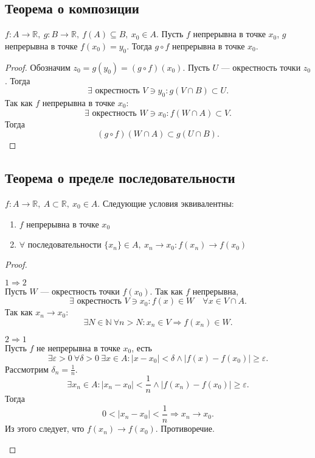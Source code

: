 \documentclass[11pt]{book}
\newcommand{\N}{\mathbb{N}}
\newcommand{\R}{\mathbb{R}}
\renewcommand{\ge}{\geqslant}
\theoremstyle{definition}
\theoremstyle{plain}
\theoremstyle{plain}
\theoremstyle{definition}
\theoremstyle{remark}
\begin{document}
\subsection{Теорема о композиции}
\begin{thm}[о композиции]
    $ f: A \to  \R, ~ g: B \to  \R, ~ f(A) \subseteq B, ~ x_0 \in A$. Пусть $ f$ непрерывна в точке $ x_0$, $ g$ непрерывна в точке  $ f(x_0) = y_0$.
    Тогда $ g\circ f$ непрерывна в точке $ x_0$.
\end{thm}
\begin{proof}
    Обозначим $ z_0 = g(y_0) = (g \circ f)(x_0)$.
    Пусть $ U$ --- окрестность точки $ z_0$. Тогда
    \[
	\exists \text{ окрестность }   V \ni y_0: g(V \cap B) \subset U
    .\]
    Так как $ f$ непрерывна в точке  $ x_0$:
    \[
	\exists  \text{ окрестность }  W \ni x_0: f(W \cap A) \subset  V
    .\]
    Тогда \[
	(g \circ f)(W \cap A) \subset g(U \cap B)
    .\]
\end{proof}
\subsection{Теорема о пределе последовательности}
\begin{thm}
    $ f: A \to \R, ~ A\subset \R, ~ x_0 \in A$.
    Следующие условия эквивалентны:
    \begin{enumerate}
	\item $ f$ непрерывна в точке  $ x_0$
	\item $ \forall \text{ последовательности }\{x_{n}\} \in A, ~ x_{n} \to  x_0: f(x_{n}) \to  f(x_0)$
    \end{enumerate}
\end{thm}
\begin{proof}
    $ $
    \begin{description}
	\item $ \boxed{1 \Longrightarrow 2}$ \\
	    Пусть  $ W$ --- окрестность точки  $ f(x_0)$.  Так как $ f$ непрерывна,
	    \[
		\exists \text{ окрестность } V \ni  x_0: f(x) \in W \quad \forall x \in V \cap A
	    .\]
	    Так как $x_{n} \to  x_0$:
	    \[
		\exists N \in \N ~ \forall n > N: x_{n} \in V \Longrightarrow f(x_{n}) \in W
	    .\]
	\item $ \boxed{2 \Longrightarrow 1}$ \\
	    Пусть $ f$ не непрерывна в точке  $ x_0$, есть
	    \[
		\exists  \varepsilon >0 ~ \forall \delta >0~ \exists x \in A: |x - x_0| < \delta \wedge |f(x) - f(x_0)| \ge \varepsilon
	    .\]
	    Рассмотрим $ \delta_n = \frac{1}{n}$.
	    \[
		\exists x_{n} \in A: |x_{n}-x_0|<\frac{1}{n} \wedge |f(x_{n}) - f(x_0)  |\ge \varepsilon
	    .\]
	    Тогда  \[
		0 < |x_{n}-x_0| < \frac{1}{n} \Longrightarrow  x_{n} \to  x_0
	    .\]
	    Из этого следует, что $ f(x_{n}) \to  f(x_0)$. Противоречие.
    \end{description}
\end{proof}
\end{document}
